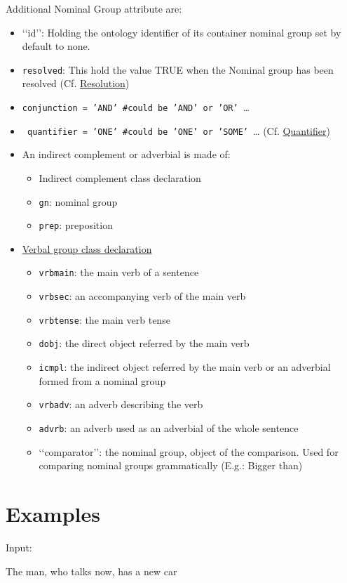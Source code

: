 \documentclass[twoside,a4paper,10pt]{report}
\newcommand{\dokutitleleveltwo}[1]{\chapter{#1}}
\newcommand{\dokumonospace}[1]{\texttt{#1}}
\newcommand{\dokuunderline}[1]{\underline{#1}}
\newcommand{\dokuitem}{\item}
\begin{document}
Additional Nominal Group attribute are:


\begin{itemize}
\dokuitem  ‘‘id’’: Holding the ontology identifier of its container nominal group set by default to none.
\dokuitem  \dokumonospace{{\textunderscore}resolved}: This hold the value TRUE when the Nominal group has been resolved (Cf. \hyperref[b7e164b34ff76b1cda93a058604190da]{Resolution})
\dokuitem  \dokumonospace{{\textunderscore}conjunction = 'AND' \#could be 'AND' or 'OR' }\ldots{} 
\dokuitem  \dokumonospace{ {\textunderscore}quantifier = 'ONE' \#could be 'ONE' or 'SOME' }\ldots{} (Cf. \hyperref[c9a5eb8d391a77a428b429e98ad45e2c]{Quantifier})
\end{itemize}

\begin{itemize}
\dokuitem  An indirect complement or adverbial is made of: 
\begin{itemize}
\dokuitem  Indirect complement class declaration
\dokuitem  \dokumonospace{gn}: nominal group
\dokuitem  \dokumonospace{prep}: preposition
\end{itemize}

\end{itemize}

\begin{itemize}
\dokuitem  \dokuunderline{Verbal group class declaration}
\begin{itemize}
\dokuitem  \dokumonospace{vrb{\textunderscore}main}: the main verb of a sentence
\dokuitem  \dokumonospace{vrb{\textunderscore}sec}: an accompanying verb of the main verb
\dokuitem  \dokumonospace{vrb{\textunderscore}tense}: the main verb tense
\dokuitem  \dokumonospace{d{\textunderscore}obj}: the direct object referred by the main verb
\dokuitem  \dokumonospace{i{\textunderscore}cmpl}: the indirect object referred by the main verb or an adverbial formed from a nominal group
\dokuitem  \dokumonospace{vrb{\textunderscore}adv}: an adverb describing the verb
\dokuitem  \dokumonospace{advrb}: an adverb used as an adverbial of the whole sentence
\dokuitem  ‘‘comparator’’: {the nominal group, object of the comparison}. Used for comparing nominal groups grammatically (E.g.: Bigger than)
\end{itemize}

\end{itemize}

\dokutitleleveltwo{Examples}
\label{bfebe34154a0dfd9fc7b447fc9ed74e9}%
Input:


\small
\begin{verbatimtab}
The man, who talks now, has a new car
\end{verbatimtab}
\normalsize
\end{document}
